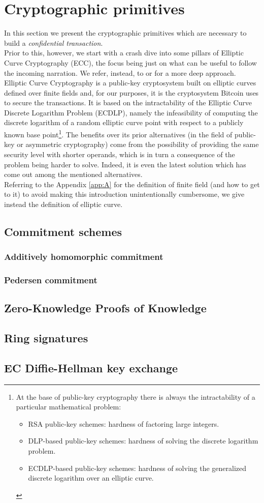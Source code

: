\chapter{Cryptographic primitives}
\label{chpr:crypto_primitives}
In this section we present the cryptographic primitives which are necessary to build a \textit{confidential transaction}.\\
Prior to this, however, we start with a crash dive into some pillars of Elliptic Curve Cryptography (ECC), the focus being just on what can be useful to follow the incoming narration. We refer, instead, to \cite{Sec} or \cite{UnderstandingCrypto} for a more deep approach.\\
Elliptic Curve Cryptography is a public-key cryptosystem built on elliptic curves defined over finite fields and, for our purposes, it is the cryptosystem Bitcoin uses to secure the transactions. It is based on the intractability of the Elliptic Curve Discrete Logarithm Problem (ECDLP), namely the infeasibility of computing the discrete logarithm of a random elliptic curve point with respect to a publicly known base point\footnote{At the base of public-key cryptography there is always the intractability of a particular mathematical problem: \begin{itemize} \item RSA public-key schemes: hardness of factoring large integers. \item DLP-based public-key schemes: hardness of solving the discrete logarithm problem. \item ECDLP-based public-key schemes: hardness of solving the generalized discrete logarithm over an elliptic curve. \end{itemize}}. The benefits over its prior alternatives (in the field of public-key or asymmetric cryptography) come from the possibility of providing the same security level with shorter operands, which is in turn a consequence of the problem being harder to solve. Indeed, it is even the latest solution which has come out among the mentioned alternatives.\\
Referring to the Appendix \ref{app:A} for the definition of finite field (and how to get to it) to avoid making this introduction unintentionally cumbersome, we give instead the definition of elliptic curve.
\section{Commitment schemes}
\subsection{Additively homomorphic commitment}
\subsection{Pedersen commitment}
\section{Zero-Knowledge Proofs of Knowledge}
\section{Ring signatures}
\section{EC Diffie-Hellman key exchange}

